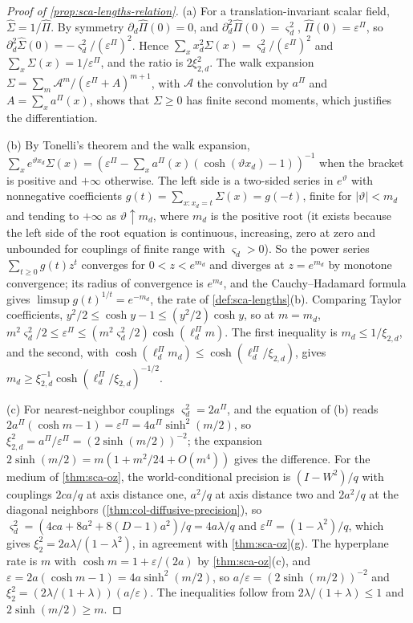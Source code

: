 \begin{proof}[Proof of \cref{prop:sca-lengths-relation}]
(a) For a translation-invariant scalar field, $\hat\Sigma=1/\hat\Pi$. By symmetry $\partial_d\hat\Pi(0)=0$, and $\partial_d^2\hat\Pi(0)=\varsigma_d^2$, $\hat\Pi(0)=\varepsilon^\Pi$, so $\partial_d^2\hat\Sigma(0)=-\varsigma_d^2/(\varepsilon^\Pi)^2$. Hence $\sum_xx_d^2\Sigma(x)=\varsigma_d^2/(\varepsilon^\Pi)^2$ and $\sum_x\Sigma(x)=1/\varepsilon^\Pi$, and the ratio is $2\xi_{2,d}^2$. The walk expansion $\Sigma=\sum_m\mathcal A^m/(\varepsilon^\Pi+A)^{m+1}$, with $\mathcal A$ the convolution by $a^\Pi$ and $A=\sum_xa^\Pi(x)$, shows that $\Sigma\ge0$ has finite second moments, which justifies the differentiation.

(b) By Tonelli's theorem and the walk expansion, $\sum_xe^{\vartheta x_d}\Sigma(x)=(\varepsilon^\Pi-\sum_xa^\Pi(x)(\cosh(\vartheta x_d)-1))^{-1}$ when the bracket is positive and $+\infty$ otherwise. The left side is a two-sided series in $e^\vartheta$ with nonnegative coefficients $g(t)=\sum_{x:x_d=t}\Sigma(x)=g(-t)$, finite for $|\vartheta|<m_d$ and tending to $+\infty$ as $\vartheta\uparrow m_d$, where $m_d$ is the positive root (it exists because the left side of the root equation is continuous, increasing, zero at zero and unbounded for couplings of finite range with $\varsigma_d>0$). So the power series $\sum_{t\ge0}g(t)z^t$ converges for $0<z<e^{m_d}$ and diverges at $z=e^{m_d}$ by monotone convergence; its radius of convergence is $e^{m_d}$, and the Cauchy--Hadamard formula gives $\limsup g(t)^{1/t}=e^{-m_d}$, the rate of \cref{def:sca-lengths}(b). Comparing Taylor coefficients, $y^2/2\le\cosh y-1\le(y^2/2)\cosh y$, so at $m=m_d$, $m^2\varsigma_d^2/2\le\varepsilon^\Pi\le(m^2\varsigma_d^2/2)\cosh(\ell^\Pi_dm)$. The first inequality is $m_d\le1/\xi_{2,d}$, and the second, with $\cosh(\ell^\Pi_dm_d)\le\cosh(\ell^\Pi_d/\xi_{2,d})$, gives $m_d\ge\xi_{2,d}^{-1}\cosh(\ell^\Pi_d/\xi_{2,d})^{-1/2}$.

(c) For nearest-neighbor couplings $\varsigma_d^2=2a^\Pi$, and the equation of (b) reads $2a^\Pi(\cosh m-1)=\varepsilon^\Pi=4a^\Pi\sinh^2(m/2)$, so $\xi_{2,d}^2=a^\Pi/\varepsilon^\Pi=(2\sinh(m/2))^{-2}$; the expansion $2\sinh(m/2)=m(1+m^2/24+O(m^4))$ gives the difference. For the medium of \cref{thm:sca-oz}, the world-conditional precision is $(I-W^2)/q$ with couplings $2ca/q$ at axis distance one, $a^2/q$ at axis distance two and $2a^2/q$ at the diagonal neighbors (\cref{thm:col-diffusive-precision}), so $\varsigma_d^2=(4ca+8a^2+8(D-1)a^2)/q=4a\lambda/q$ and $\varepsilon^\Pi=(1-\lambda^2)/q$, which gives $\xi_2^2=2a\lambda/(1-\lambda^2)$, in agreement with \cref{thm:sca-oz}(g). The hyperplane rate is $m$ with $\cosh m=1+\varepsilon/(2a)$ by \cref{thm:sca-oz}(c), and $\varepsilon=2a(\cosh m-1)=4a\sinh^2(m/2)$, so $a/\varepsilon=(2\sinh(m/2))^{-2}$ and $\xi_2^2=(2\lambda/(1+\lambda))(a/\varepsilon)$. The inequalities follow from $2\lambda/(1+\lambda)\le1$ and $2\sinh(m/2)\ge m$.
\end{proof}

